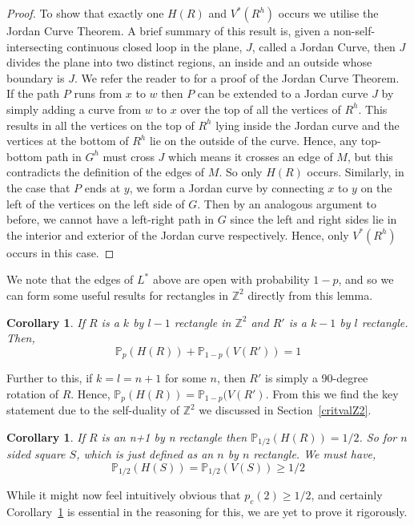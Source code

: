 \documentclass[a4paper,11pt]{article}
\newtheorem{corollary}[theorem]{Corollary}
\theoremstyle{definition}
\newcommand{\ints}{\mathbb{Z}}
\newcommand{\prob}{\mathbb{P}_p}
\begin{document}
\begin{proof}
	To show that exactly one  $H(R)$ and $V^*(R^h)$ occurs we utilise the Jordan Curve Theorem. A brief summary of this result is, given a non-self-intersecting continuous closed loop in the plane, $J$, called a Jordan Curve, then $J$ divides the plane into two distinct regions, an inside and an outside whose boundary is $J$. We refer the reader to \cite{kosniowski_1980} for a proof of the Jordan Curve Theorem. If the path $P$ runs from $x$ to $w$ then $P$ can be extended to a Jordan curve $J$ by simply adding a curve from $w$ to $x$ over the top of all the vertices of $R^h$. This results in all the vertices on the top of $R^h$ lying inside the Jordan curve and the vertices at the bottom of $R^h$ lie on the outside of the curve. Hence, any top-bottom path in $G^h$ must cross $J$ which means it crosses an edge of $M$, but this contradicts the definition of the edges of $M$. So only $H(R)$ occurs.
	Similarly, in the case that $P$ ends at $y$, we form a Jordan curve by connecting $x$ to $y$ on the left of the vertices on the left side of $G$. Then by an analogous argument to before, we cannot have a left-right path in $G$ since the left and right sides lie in the interior and exterior of the Jordan curve respectively. Hence, only $V^*(R^h)$ occurs in this case.
\end{proof}

We note that the edges of $L^*$ above are open with probability $1-p$, and so we can form some useful results for rectangles in $\ints^2$ directly from this lemma.

\begin{corollary}
	If $R$ is a $k$ by $l-1$ rectangle in $\ints^2$ and $R'$ is a $k-1$ by $l$ rectangle. Then,
	$$\prob(H(R))+\mathbb{P}_{1-p}(V(R')) = 1 $$
\end{corollary}

Further to this, if $k = l = n+1$ for some $n$, then $R'$ is simply a 90-degree rotation of $R$. Hence, $\prob(H(R)) = \mathbb{P}_{1-p}(V(R')$. From this we find the key statement due to the self-duality of $\ints^2$ we discussed in Section~\ref*{critvalZ2}.

\begin{corollary}\label{squareGEQhalf}
	If $R$ is an n+1 by n rectangle then $\mathbb{P}_{1/2}(H(R)) = 1/2$. So for $n$ sided square $S$, which is just defined as an $n$ by $n$ rectangle. We must have,
	$$\mathbb{P}_{1/2}(H(S))=\mathbb{P}_{1/2}(V(S)) \geq 1/2$$
\end{corollary}

While it might now feel intuitively obvious that $p_c(2) \geq 1/2$, and certainly Corollary~\ref*{squareGEQhalf} is essential in the reasoning for this, we are yet to prove it rigorously.
\end{document}
